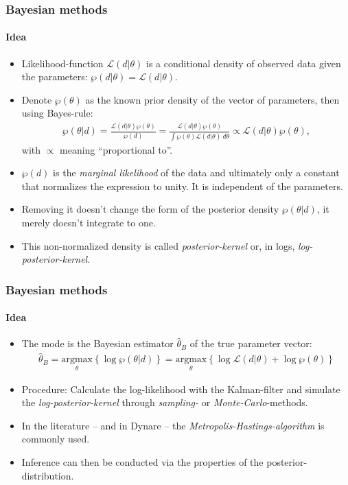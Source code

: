 \documentclass[handout]{beamer}  %
\begin{document}
\begin{frame}\frametitle{Bayesian methods}\framesubtitle{Idea}
  \begin{itemize}
     \item Likelihood-function $\mathcal{L}({d}|{\theta})$ is a conditional density of observed data given the parameters:
$\wp({d}|{\theta})=\mathcal{L}({d}|{\theta})$.
     \item Denote $\wp({\theta})$ as the known prior density of the vector of parameters, then using Bayes-rule:
\begin{align*}
    \wp({\theta}|{d}) = \frac{\mathcal{L}({d}|{\theta})\wp({\theta})}{\wp({d})} =  \frac{\mathcal{L}({d}|{\theta})\wp({\theta})}{\int \wp({\theta}) \mathcal{L}({d|{\theta}}) ~d{\theta}} \propto \mathcal{L}({d}|{\theta})\wp({\theta}),
\end{align*}
with $\propto$ meaning \enquote{proportional to}.

     \item $\wp({d})$ is the \emph{marginal likelihood} of the data and ultimately only a constant that normalizes the expression to unity. It is independent of the parameters.
    \item Removing it doesn't change the form of the posterior density $\wp({\theta}|{d})$, it merely doesn't integrate to one.
     \item This non-normalized density is called \emph{posterior-kernel} or, in logs, \emph{log-posterior-kernel}.
   \end{itemize}
\end{frame}

\begin{frame}\frametitle{Bayesian methods}\framesubtitle{Idea}
  \begin{itemize}
    \item The mode is the Bayesian estimator ${\widehat{\theta}_B}$ of the true parameter vector:
\begin{align*}
    {\widehat{\theta}_B} = \underset{\theta}{\text{argmax}}\left\{\log{\wp({\theta}|{d})}\right\} = \underset{\theta}{\text{argmax}}\left\{ \log{\mathcal{L}({d}|{\theta})} + \log{\wp({\theta})} \right\}
\end{align*}
    \item Procedure: Calculate the log-likelihood with the Kalman-filter and simulate the \emph{log-posterior-kernel} through \emph{sampling-} or \emph{Monte-Carlo}-methods.
    \item  In the literature -- and in Dynare -- the \emph{Metropolis-Hastings-algorithm} is commonly used.
    \item  Inference can then be conducted via the properties of the posterior-distribution.
  \end{itemize}
\end{frame}
\end{document}
